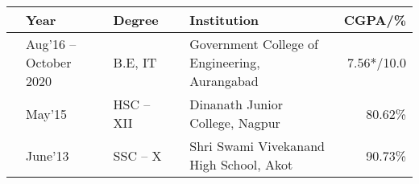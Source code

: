 \vspace{1mm}
\newcommand{\education}[4]{
  & #1 & #2 & & #3 & #4
}
\begin{center}
\begin{tabular}{ | L{0.05cm} l | L{3cm} | L{0.05cm} C{7cm} | r |}
  \hline
  \education{\textbf{Year}}{\textbf{Degree}}{\textbf{Institution}}{\textbf{CGPA/\%}}\\
  \hline
  \education{Aug'16 -- October 2020}{B.E, IT}{Government College of Engineering, Aurangabad}{7.56*/10.0}\\
  \education{May'15}{HSC -- XII}{Dinanath Junior College, Nagpur}{80.62\%}\\
  \education{June'13}{SSC -- X}{Shri Swami Vivekanand High School, Akot }{90.73\%}\\
  \hline
\end{tabular}
\end{center}


